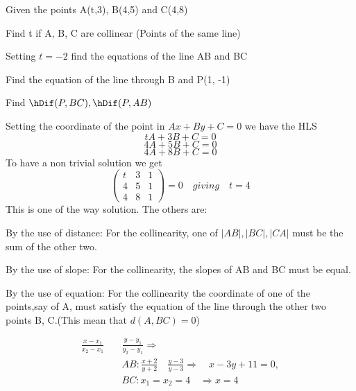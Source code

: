 \documentclass[11pt]{amsbook}
\begin{document}
\begin{exmp}
Given the points A(t,3), B(4,5) and C(4,8)
 \begin{hEnumerateAlpha}
    \item Find t if A, B, C are collinear (Points of the same line)
    \item Setting $t=-2$ find the equations of the line AB and BC
    \item Find the equation of the line through B and P(1, -1)
    \item Find $\hDif(P, BC), \hDif(P, AB)$
 \end{hEnumerateAlpha}
 \end{exmp}
\begin{hSolution}
\begin{hEnumerateAlpha}
\item Setting the coordinate of the point in $Ax+ By+ C = 0$   we have the HLS
$$tA + 3B + C = 0$$
$$4A + 5B + C = 0$$
$$4A + 8B + C = 0$$
To have a non trivial solution we get
$$
    \begin{pmatrix} 
    t&3&1  \\
    4&5&1  \\
    4&8&1  
    \end{pmatrix}
    = 0\quad giving\quad t = 4
$$
This is one of the way solution. The others are:
\begin{hEnumerateArabic}
\item By the use of distance: For the collinearity, one of $|AB|, |BC|, |CA|$ must be the sum of the other two.
\item By the use of slope: For the collinearity, the slopes of AB and BC must be equal.
\item By the use of equation: For the collinearity the coordinate of one of the points,say of A, must satisfy the equation of the line through the other two points B, C.(This mean that $d(A, BC)= 0$)
\end{hEnumerateArabic}
\item 
\[
    \begin{split}
    \frac{x-x_1}{x_2-x_1} \quad &\frac{y-y_1}{y_2-y_1}\Longrightarrow \\
    &AB: \frac{x+2}{y+2} \quad \frac{y-3}{y-3} \Longrightarrow \quad x-3y+11=0, \\
    &BC: x_1 = x_2 = 4 \quad \Longrightarrow x = 4
    \end{split}
\]




\end{hEnumerateAlpha}
\end{hSolution}





























\end{document}
